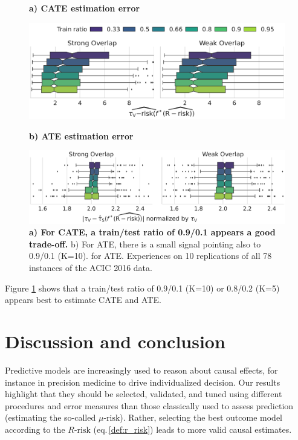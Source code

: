 \documentclass[french,12pt,twoside,a4paper]{book}
\begin{document}
\begin{figure}[!t]
  \begin{minipage}{.5\textwidth}
    \centerline{\textbf{a) CATE estimation error}}
    \includegraphics[width=\linewidth]{img/chapter_5/_5_train_size_evaluated_metric_r_risk__evaluation_validation_tau_risk__best_tau_norm__False_norm_False__acic16.pdf}
  \end{minipage}
  \begin{minipage}{.5\textwidth}
    \centerline{\textbf{b) ATE estimation error}}
    \includegraphics[width=\linewidth]{img/chapter_5/_5_train_size_evaluated_metric_r_risk__evaluation_validation_test_abs_bias_ate__best_tau_norm__False_norm_True__acic16.pdf}
  \end{minipage}%
  \caption{\textbf{a) For CATE, a train/test ratio of 0.9/0.1 appears a good
      trade-off.} b) For ATE, there is a small signal pointing also to
    0.9/0.1 (K=10).
    for ATE. Experiences on 10 replications of all 78 instances of the ACIC 2016
    data.}\label{fig:train_test_ratio}
\end{figure}

Figure \ref{fig:train_test_ratio} shows that a train/test ratio of
0.9/0.1 (K=10) or 0.8/0.2 (K=5) appears best to estimate CATE and
ATE.


\section{Discussion and conclusion}\label{sec:discussion}

Predictive models are increasingly used to reason about causal effects,
for instance in precision medicine to drive individualized decision.
Our results highlight that they should be selected, validated, and tuned
using different procedures and error measures than those classically used
to assess prediction (estimating the so-called $\mu\text{-risk}$).
Rather, selecting the best outcome model according to the $R\text{-risk}$
(eq.\,\ref{def:r_risk}) leads to more valid causal estimates.
\end{document}
